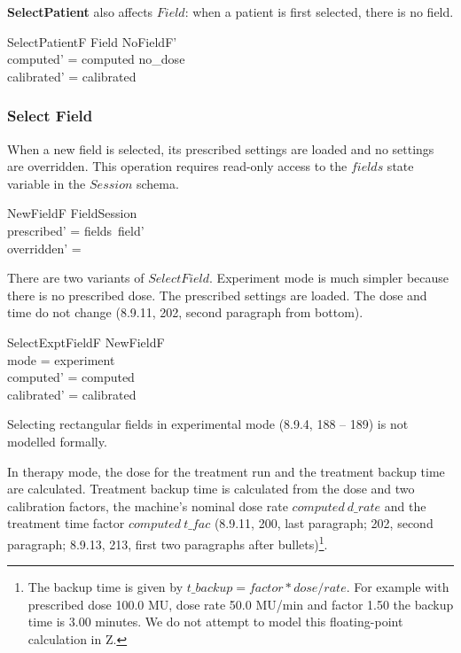 {\bf SelectPatient} also affects $Field$: when a patient is first selected,
there is no field.


\begin{schema}{SelectPatientF}
	\Delta Field
\where
	NoFieldF' \\
	computed' = computed \oplus no\_dose \\
\also
	calibrated' = calibrated \\
\end{schema}

\subsubsection{Select Field} \label{sect:sel-field-f}

When a new field is selected, its prescribed settings are loaded and
no settings are overridden.  This operation requires read-only access
to the $fields$ state variable in the $Session$ schema.

\begin{schema}{NewFieldF}
	\Delta FieldSession \\
\where
	prescribed' = fields~field' \\
	overridden' = \emptyset \\
\end{schema}
There are two variants of $SelectField$. Experiment mode is much
simpler because there is no prescribed dose.  The prescribed settings
are loaded.  The dose and time do not change (8.9.11, 202, second
paragraph from bottom).

\begin{schema}{SelectExptFieldF}
	NewFieldF \\
\where	
	mode = experiment \\
	computed' = computed \\
	calibrated' = calibrated \\
\end{schema}
Selecting rectangular fields in experimental mode (8.9.4, 188 -- 189)
is not modelled formally.

In therapy mode, the dose for the treatment run and the treatment
backup time are calculated.  Treatment backup time is calculated from
the dose and two calibration factors, the machine's nominal dose rate
$computed~d\_rate$ and the treatment time factor $computed~t\_fac$
(8.9.11, 200, last paragraph; 202, second paragraph; 8.9.13, 213,
first two paragraphs after bullets)\footnote{The backup time is given
by $t\_backup = factor * dose / rate$. For example with prescribed
dose 100.0 MU, dose rate 50.0 MU/min and factor 1.50 the backup time
is 3.00 minutes.  We do not attempt to model this floating-point
calculation in Z.}.

